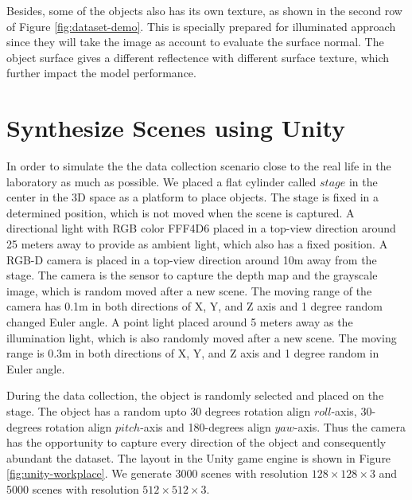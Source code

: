 \documentclass[border=15pt, multi, tikz]{article}
\begin{document}
Besides, some of the objects also has its own texture, as shown in the second row of Figure \ref{fig:dataset-demo}. This is specially prepared for illuminated approach since they will take the image as account to evaluate the surface normal. The object surface gives a different reflectence with different surface texture, which further impact the model performance. 

\newcommand{\col}[1]{%
	\textcolor{#1}{\vrule width 0.5cm}}
\section{Synthesize Scenes using Unity}
In order to simulate the the data collection scenario close to the real life in the laboratory as much as possible. We placed a flat cylinder called $ stage $ in the center in the 3D space as a platform to place objects. The stage is fixed in a determined position, which is not moved when the scene is captured. 
A directional light with RGB color FFF4D6 \col{direction-light-color}  placed in a top-view direction around 25 meters away to provide as ambient light, which also has a fixed position.
A RGB-D camera is placed in a top-view direction around 10m away from the stage. The camera is the sensor to capture the depth map and the grayscale image, which is random moved after a new scene. The moving range of the camera has 0.1m in both directions of X, Y, and Z axis and 1 degree random changed Euler angle. 
A point light placed around 5 meters away as the illumination light, which is also randomly moved after a new scene. The moving range is 0.3m in both directions of X, Y, and Z axis and 1 degree random in Euler angle.

During the data collection, the object is randomly selected and placed on the stage. The object has a random upto 30 degrees rotation align $ roll $-axis, 30-degrees rotation align $ pitch $-axis and 180-degrees align $ yaw $-axis. Thus the camera has the opportunity to capture every direction of the object and consequently abundant the dataset. The layout in the Unity game engine is shown in Figure \ref{fig:unity-workplace}. We generate 3000 scenes with resolution $ 128\times128\times3 $ and 5000 scenes with resolution $ 512\times512\times3 $.
\end{document}
